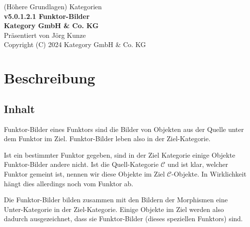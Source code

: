 \documentclass[a4paper]{amsart}
\theoremstyle{definition}
\newcommand{\CC}{\ensuremath{\mathcal{ C }}}
\begin{document}
\begin{titlepage}
\centering
{\huge
(Höhere Grundlagen) Kategorien\\[1cm]
\textbf{v5.0.1.2.1 Funktor-Bilder}
}\\[1cm]

\textbf{Kategory GmbH \& Co. KG}\\
Präsentiert von Jörg Kunze\\
Copyright (C) 2024 Kategory GmbH \& Co. KG

\end{titlepage}

%

\newpage

\section*{Beschreibung}

\subsection*{Inhalt}
Funktor-Bilder eines Funktors sind die Bilder von Objekten aus der Quelle unter dem Funktor im Ziel. Funktor-Bilder leben also in der Ziel-Kategorie.

Ist ein bestimmter Funktor gegeben, sind in der Ziel Kategorie einige Objekte Funktor-Bilder andere nicht. Ist die Quell-Kategorie $\CC$ und ist klar, welcher Funktor gemeint ist, nennen wir diese Objekte im Ziel $\CC$-Objekte. In Wirklichkeit hängt dies allerdings noch vom Funktor ab. 

Die Funktor-Bilder bilden zusammen mit den Bildern der Morphismen eine Unter-Kategorie in der Ziel-Kategorie. Einige Objekte im Ziel werden also dadurch ausgezeichnet, dass sie Funktor-Bilder (dieses speziellen Funktors) sind.
\end{document}
